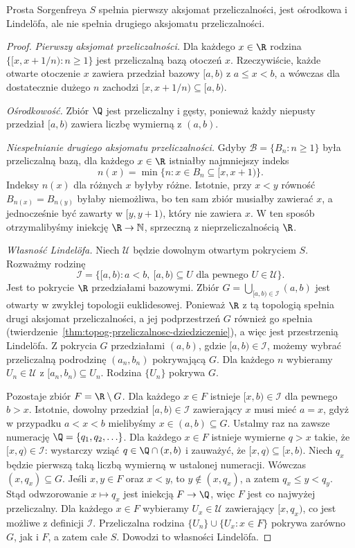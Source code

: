 \begin{twierdzenie}
\label{thm:topog-sorgenfrey-wlasnosci-przeliczalnosc}
Prosta Sorgenfreya $S$ spełnia pierwszy aksjomat
przeliczalności, jest ośrodkowa i Lindelöfa,
ale nie spełnia drugiego aksjomatu przeliczalności.
\end{twierdzenie}
\begin{proof}
\emph{Pierwszy aksjomat przeliczalności.} Dla każdego $x\in\R$ rodzina
$\{[x,x+1/n):n\geq1\}$ jest przeliczalną bazą otoczeń $x$.
Rzeczywiście, każde otwarte otoczenie $x$ zawiera przedział
bazowy $[a,b)$ z $a\leq x<b$, a wówczas dla dostatecznie
dużego $n$ zachodzi $[x,x+1/n)\subseteq[a,b)$.

\emph{Ośrodkowość.} Zbiór $\Q$ jest przeliczalny i gęsty,
ponieważ każdy niepusty przedział $[a,b)$ zawiera
liczbę wymierną z $(a,b)$.

\emph{Niespełnianie drugiego aksjomatu przeliczalności.} Gdyby
$\mathcal B=\{B_n:n\geq1\}$ była przeliczalną bazą,
dla każdego $x\in\R$ istniałby najmniejszy indeks
\[
 n(x)=\min\{n:x\in B_n\subseteq[x,x+1)\}.
\]
Indeksy $n(x)$ dla różnych $x$ byłyby różne. Istotnie,
przy $x<y$ równość $B_{n(x)}=B_{n(y)}$ byłaby
niemożliwa, bo ten sam zbiór musiałby zawierać $x$,
a jednocześnie być zawarty w $[y,y+1)$,
który nie zawiera $x$. W ten sposób otrzymalibyśmy
iniekcję $\R\to\mathbb N$, sprzeczną z
nieprzeliczalnością $\R$.

\emph{Własność Lindelöfa.} Niech $\mathcal U$ będzie
dowolnym otwartym pokryciem $S$. Rozważmy rodzinę
\[
 \mathcal I=\{[a,b):a<b,\ [a,b)\subseteq U
 \text{ dla pewnego }U\in\mathcal U\}.
\]
Jest to pokrycie $\R$ przedziałami bazowymi.
Zbiór $G=\bigcup_{[a,b)\in\mathcal I}(a,b)$ jest
otwarty w zwykłej topologii euklidesowej. Ponieważ
$\R$ z tą topologią spełnia drugi aksjomat
przeliczalności, a jej podprzestrzeń $G$ również go spełnia
(twierdzenie~\ref{thm:topog-przeliczalnosc-dziedziczenie}),
a więc jest przestrzenią Lindelöfa. Z pokrycia $G$ przedziałami $(a,b)$,
gdzie $[a,b)\in\mathcal I$, możemy wybrać
przeliczalną podrodzinę $(a_n,b_n)$ pokrywającą $G$.
Dla każdego $n$ wybieramy $U_n\in\mathcal U$
z $[a_n,b_n)\subseteq U_n$. Rodzina $\{U_n\}$ pokrywa $G$.

Pozostaje zbiór $F=\R\setminus G$. Dla każdego $x\in F$
istnieje $[x,b)\in\mathcal I$ dla pewnego $b>x$.
Istotnie, dowolny przedział $[a,b)\in\mathcal I$
zawierający $x$ musi mieć $a=x$, gdyż w przypadku
$a<x<b$ mielibyśmy $x\in(a,b)\subseteq G$.
Ustalmy raz na zawsze numerację $\Q=\{q_1,q_2,\ldots\}$.
Dla każdego $x\in F$ istnieje wymierne $q>x$ takie,
że $[x,q)\in\mathcal I$: wystarczy wziąć
$q\in\Q\cap(x,b)$ i zauważyć, że $[x,q)\subseteq[x,b)$.
Niech $q_x$ będzie pierwszą taką liczbą wymierną
w ustalonej numeracji. Wówczas $(x,q_x)\subseteq G$.
Jeśli $x,y\in F$ oraz $x<y$, to $y\notin(x,q_x)$,
a zatem $q_x\leq y<q_y$. Stąd odwzorowanie
$x\mapsto q_x$ jest iniekcją $F\to\Q$, więc $F$
jest co najwyżej przeliczalny. Dla każdego $x\in F$
wybieramy $U_x\in\mathcal U$ zawierający $[x,q_x)$,
co jest możliwe z definicji $\mathcal I$.
Przeliczalna rodzina $\{U_n\}\cup\{U_x:x\in F\}$
pokrywa zarówno $G$, jak i $F$, a zatem całe $S$.
Dowodzi to własności Lindelöfa.
\end{proof}

